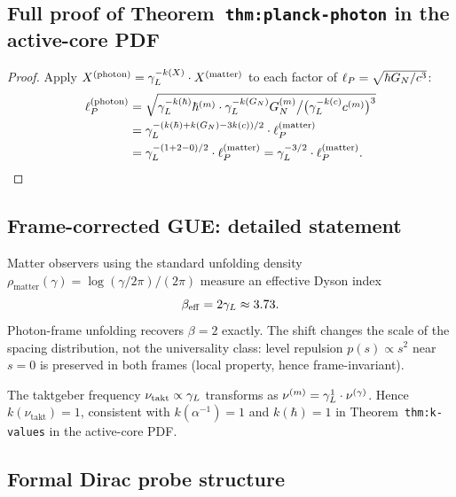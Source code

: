 \subsection*{Full proof of Theorem~\texttt{thm:planck-photon} in the active-core PDF}
\label{app:planck}

\begin{proof}
Apply $X^{(\mathrm{photon})}=\gamma_L^{-k(X)}\cdot X^{(\mathrm{matter})}$
to each factor of $\ell_P=\sqrt{\hbar G_N/c^3}$:
\begin{align*}
  \ell_P^{(\mathrm{photon})}
  &= \sqrt{
       \gamma_L^{-k(\hbar)}\hbar^{(m)}
       \cdot\gamma_L^{-k(G_N)}G_N^{(m)}
       \big/
       \bigl(\gamma_L^{-k(c)}c^{(m)}\bigr)^3
     }\\
  &= \gamma_L^{-(k(\hbar)+k(G_N)-3k(c))/2}
     \cdot\ell_P^{(\mathrm{matter})}\\
  &= \gamma_L^{-(1+2-0)/2}\cdot\ell_P^{(\mathrm{matter})}
   = \gamma_L^{-3/2}\cdot\ell_P^{(\mathrm{matter})}.\qedhere
\end{align*}
\end{proof}

\subsection{Frame-corrected GUE: detailed statement}
\label{app:gue-frame}

\begin{proposition}
Matter observers using the standard unfolding density
$\rho_{\mathrm{matter}}(\gamma)=\log(\gamma/2\pi)/(2\pi)$
measure an effective Dyson index
\[
  \beta_{\mathrm{eff}} = 2\gamma_L\approx 3.73.
\]
Photon-frame unfolding recovers $\beta=2$ exactly.
The shift changes the scale of the spacing distribution, not the
universality class: level repulsion $p(s)\propto s^2$ near $s=0$ is
preserved in both frames (local property, hence frame-invariant).
\end{proposition}

\begin{corollary}
The taktgeber frequency $\nu_{\mathrm{takt}}\propto\gamma_L$
transforms as $\nu^{(m)}=\gamma_L^1\cdot\nu^{(\gamma)}$.
Hence $k(\nu_{\mathrm{takt}})=1$, consistent with $k(\alpha^{-1})=1$
and $k(\hbar)=1$ in Theorem~\texttt{thm:k-values} in the active-core PDF.
\end{corollary}

\subsection{Formal Dirac probe structure}
\label{app:dirac-formal}

